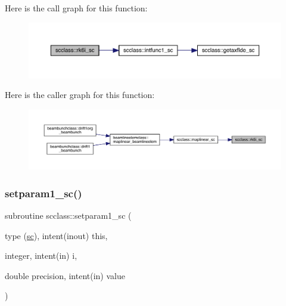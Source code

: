 Here is the call graph for this function\+:\nopagebreak
\begin{figure}[H]
\begin{center}
\leavevmode
\includegraphics[width=350pt]{namespacescclass_a4b16987e1d3852123c69a6bfc0cec75a_cgraph}
\end{center}
\end{figure}
Here is the caller graph for this function\+:\nopagebreak
\begin{figure}[H]
\begin{center}
\leavevmode
\includegraphics[width=350pt]{namespacescclass_a4b16987e1d3852123c69a6bfc0cec75a_icgraph}
\end{center}
\end{figure}
\mbox{\label{namespacescclass_a23a57a64ee6a74149bbc9cf009ce8711}} 
\subsubsection{\texorpdfstring{setparam1\_sc()}{setparam1\_sc()}}
{\footnotesize\ttfamily subroutine scclass\+::setparam1\+\_\+sc (\begin{DoxyParamCaption}\item[{type (\mbox{\hyperlink{namespacescclass_structscclass_1_1sc}{sc}}), intent(inout)}]{this,  }\item[{integer, intent(in)}]{i,  }\item[{double precision, intent(in)}]{value }\end{DoxyParamCaption})}

\mbox{\label{namespacescclass_af35b79ac06dc2b6bec2d97f6e745ab20}} 
